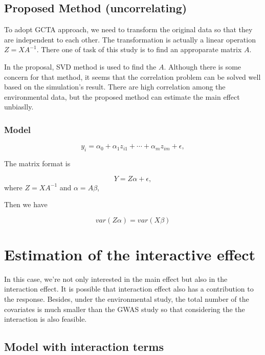 \documentclass[]{article}
\begin{document}
\subsection{\texorpdfstring{Proposed Method
(\textbf{uncorrelating})}{Proposed Method (uncorrelating)}}\label{proposed-method-uncorrelating}

To adopt GCTA approach, we need to transform the original data so that
they are independent to each other. The transformation is actually a
linear operation \(Z = XA^{-1}\). There one of task of this study is to
find an approparate matrix \(A\).

In the proposal, SVD method is used to find the \(A\). Although there is
some concern for that method, it seems that the correlation problem can
be solved well based on the simulation's result. There are high
correlation among the environmental data, but the proposed method can
estimate the main effect unbiaslly.

\subsubsection{Model}\label{model-1}

\[
  y_i = \alpha_0 + \alpha_{1}z_{i1}+\cdots+\alpha_{m}z_{im} + \epsilon,    
\]

The matrix format is

\[
  Y = Z\alpha + \epsilon,    
\] where \(Z = XA^{-1}\) and \(\alpha = A\beta\),

Then we have

\[
  var(Z\alpha) = var(X\beta)
\]

\section{Estimation of the interactive
effect}\label{estimation-of-the-interactive-effect}

In this case, we're not only interested in the main effect but also in
the interaction effect. It is possible that interaction effect also has
a contribution to the response. Besides, under the environmental study,
the total number of the covariates is much smaller than the GWAS study
so that considering the the interaction is also feasible.

\subsection{Model with interaction
terms}\label{model-with-interaction-terms}
\end{document}
